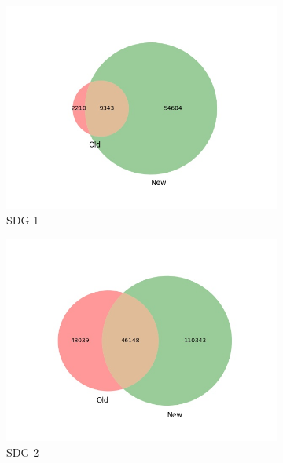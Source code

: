 \documentclass{article}
\begin{document}
\begin{figure}[H]
    \centering
    \begin{subfigure}{0.24\textwidth}
        \centering
        \includegraphics[width=\textwidth]{figures/aurora-elsevier-venn/venn_sdg_1.jpg}
	    \caption{SDG 1}
    \end{subfigure}
    \hfill
    \begin{subfigure}{0.24\textwidth}
        \centering
        \includegraphics[width=\textwidth]{figures/aurora-elsevier-venn/venn_sdg_2.jpg}
	    \caption{SDG 2}
    \end{subfigure}
    \hfill
    \begin{subfigure}{0.24\textwidth}
        \centering

\end{subfigure}
\end{figure}
\end{document}
